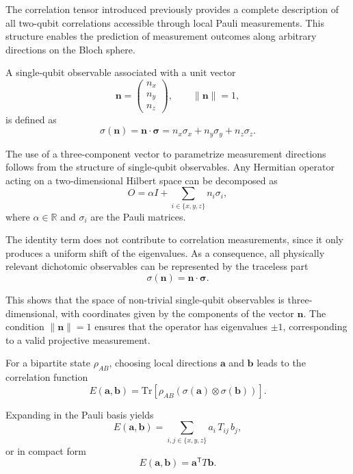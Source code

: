 \documentclass[a4paper]{article}
\begin{document}
The correlation tensor introduced previously provides a complete description of all two-qubit correlations accessible through local Pauli measurements. This structure enables the prediction of measurement outcomes along arbitrary directions on the Bloch sphere.

\medskip

A single-qubit observable associated with a unit vector
\[
\mathbf{n} =
\begin{pmatrix}
n_x\\
n_y\\
n_z
\end{pmatrix},
\qquad
\|\mathbf{n}\| = 1,
\]
is defined as
\[
\sigma(\mathbf{n})
=
\mathbf{n} \cdot \boldsymbol{\sigma}
=
n_x \sigma_x + n_y \sigma_y + n_z \sigma_z.
\]

\medskip

The use of a three-component vector to parametrize measurement directions follows from the structure of single-qubit observables. Any Hermitian operator acting on a two-dimensional Hilbert space can be decomposed as
\[
O = \alpha I + \sum_{i \in \{x,y,z\}} n_i \sigma_i,
\]
where \( \alpha \in \mathbb{R} \) and \( \sigma_i \) are the Pauli matrices.

\medskip

The identity term does not contribute to correlation measurements, since it only produces a uniform shift of the eigenvalues. As a consequence, all physically relevant dichotomic observables can be represented by the traceless part
\[
\sigma(\mathbf{n}) = \mathbf{n} \cdot \boldsymbol{\sigma}.
\]

\medskip

This shows that the space of non-trivial single-qubit observables is three-dimensional, with coordinates given by the components of the vector \( \mathbf{n} \). The condition \( \|\mathbf{n}\| = 1 \) ensures that the operator has eigenvalues \( \pm 1 \), corresponding to a valid projective measurement.

\medskip

For a bipartite state \( \rho_{AB} \), choosing local directions \( \mathbf{a} \) and \( \mathbf{b} \) leads to the correlation function
\[
E(\mathbf{a},\mathbf{b})
=
\mathrm{Tr}
\left[
\rho_{AB}
\left(
\sigma(\mathbf{a}) \otimes \sigma(\mathbf{b})
\right)
\right].
\]

\medskip

Expanding in the Pauli basis yields
\[
E(\mathbf{a},\mathbf{b})
=
\sum_{i,j \in \{x,y,z\}}
a_i\, T_{ij}\, b_j,
\]
or in compact form
\[
E(\mathbf{a},\mathbf{b})
=
\mathbf{a}^{\mathsf T} T \mathbf{b}.
\]
\end{document}

